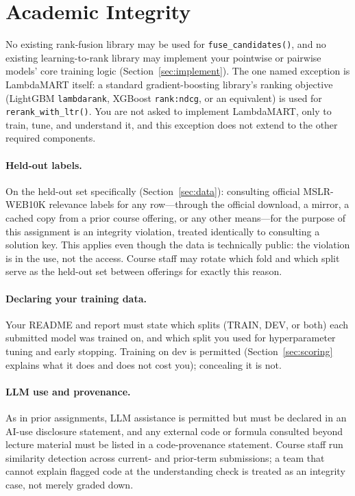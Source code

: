 \documentclass[10pt]{article}
\begin{document}
\section{Academic Integrity}
\label{sec:integrity}

No existing rank-fusion library may be used for \texttt{fuse\_candidates()}, and no existing learning-to-rank library may implement your pointwise or pairwise models' core training logic (Section~\ref{sec:implement}). The one named exception is LambdaMART itself: a standard gradient-boosting library's ranking objective (LightGBM \texttt{lambdarank}, XGBoost \texttt{rank:ndcg}, or an equivalent) is used for \texttt{rerank\_with\_ltr()}. You are not asked to implement LambdaMART, only to train, tune, and understand it, and this exception does not extend to the other required components.

\paragraph{Held-out labels.}
On the held-out set specifically (Section~\ref{sec:data}): consulting official MSLR-WEB10K relevance labels for any row---through the official download, a mirror, a cached copy from a prior course offering, or any other means---for the purpose of this assignment is an integrity violation, treated identically to consulting a solution key. This applies even though the data is technically public: the violation is in the use, not the access. Course staff may rotate which fold and which split serve as the held-out set between offerings for exactly this reason.

\paragraph{Declaring your training data.}
Your README and report must state which splits (TRAIN, DEV, or both) each submitted model was trained on, and which split you used for hyperparameter tuning and early stopping. Training on dev is permitted (Section~\ref{sec:scoring} explains what it does and does not cost you); concealing it is not.

\paragraph{LLM use and provenance.}
As in prior assignments, LLM assistance is permitted but must be declared in an AI-use disclosure statement, and any external code or formula consulted beyond lecture material must be listed in a code-provenance statement. Course staff run similarity detection across current- and prior-term submissions; a team that cannot explain flagged code at the understanding check is treated as an integrity case, not merely graded down.
\end{document}
